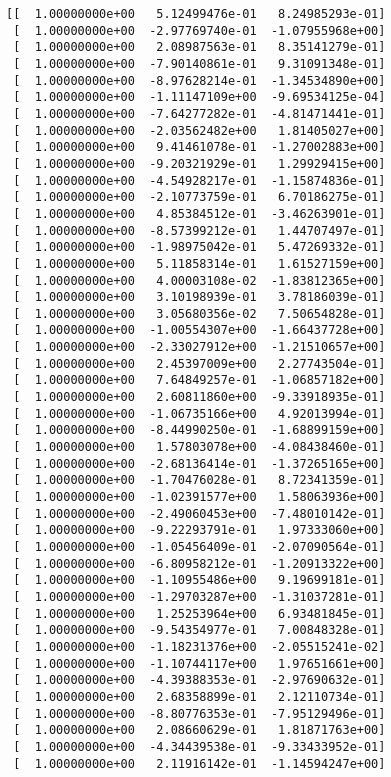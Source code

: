 \documentclass[11pt]{article}
\begin{document}
    \begin{Verbatim}[commandchars=\\\{\}]
[[  1.00000000e+00   5.12499476e-01   8.24985293e-01]
 [  1.00000000e+00  -2.97769740e-01  -1.07955968e+00]
 [  1.00000000e+00   2.08987563e-01   8.35141279e-01]
 [  1.00000000e+00  -7.90140861e-01   9.31091348e-01]
 [  1.00000000e+00  -8.97628214e-01  -1.34534890e+00]
 [  1.00000000e+00  -1.11147109e+00  -9.69534125e-04]
 [  1.00000000e+00  -7.64277282e-01  -4.81471441e-01]
 [  1.00000000e+00  -2.03562482e+00   1.81405027e+00]
 [  1.00000000e+00   9.41461078e-01  -1.27002883e+00]
 [  1.00000000e+00  -9.20321929e-01   1.29929415e+00]
 [  1.00000000e+00  -4.54928217e-01  -1.15874836e-01]
 [  1.00000000e+00  -2.10773759e-01   6.70186275e-01]
 [  1.00000000e+00   4.85384512e-01  -3.46263901e-01]
 [  1.00000000e+00  -8.57399212e-01   1.44707497e-01]
 [  1.00000000e+00  -1.98975042e-01   5.47269332e-01]
 [  1.00000000e+00   5.11858314e-01   1.61527159e+00]
 [  1.00000000e+00   4.00003108e-02  -1.83812365e+00]
 [  1.00000000e+00   3.10198939e-01   3.78186039e-01]
 [  1.00000000e+00   3.05680356e-02   7.50654828e-01]
 [  1.00000000e+00  -1.00554307e+00  -1.66437728e+00]
 [  1.00000000e+00  -2.33027912e+00  -1.21510657e+00]
 [  1.00000000e+00   2.45397009e+00   2.27743504e-01]
 [  1.00000000e+00   7.64849257e-01  -1.06857182e+00]
 [  1.00000000e+00   2.60811860e+00  -9.33918935e-01]
 [  1.00000000e+00  -1.06735166e+00   4.92013994e-01]
 [  1.00000000e+00  -8.44990250e-01  -1.68899159e+00]
 [  1.00000000e+00   1.57803078e+00  -4.08438460e-01]
 [  1.00000000e+00  -2.68136414e-01  -1.37265165e+00]
 [  1.00000000e+00  -1.70476028e-01   8.72341359e-01]
 [  1.00000000e+00  -1.02391577e+00   1.58063936e+00]
 [  1.00000000e+00  -2.49060453e+00  -7.48010142e-01]
 [  1.00000000e+00  -9.22293791e-01   1.97333060e+00]
 [  1.00000000e+00  -1.05456409e-01  -2.07090564e-01]
 [  1.00000000e+00  -6.80958212e-01  -1.20913322e+00]
 [  1.00000000e+00  -1.10955486e+00   9.19699181e-01]
 [  1.00000000e+00  -1.29703287e+00  -1.31037281e-01]
 [  1.00000000e+00   1.25253964e+00   6.93481845e-01]
 [  1.00000000e+00  -9.54354977e-01   7.00848328e-01]
 [  1.00000000e+00  -1.18231376e+00  -2.05515241e-02]
 [  1.00000000e+00  -1.10744117e+00   1.97651661e+00]
 [  1.00000000e+00  -4.39388353e-01  -2.97690632e-01]
 [  1.00000000e+00   2.68358899e-01   2.12110734e-01]
 [  1.00000000e+00  -8.80776353e-01  -7.95129496e-01]
 [  1.00000000e+00   2.08660629e-01   1.81871763e+00]
 [  1.00000000e+00  -4.34439538e-01  -9.33433952e-01]
 [  1.00000000e+00   2.11916142e-01  -1.14594247e+00]

\end{Verbatim}
\end{document}
